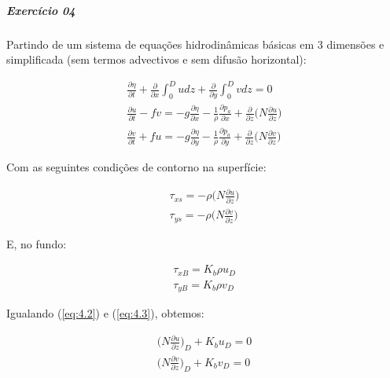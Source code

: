 \documentclass[11pt]{article}
\begin{document}
    \subparagraph{Exercício 04}\label{exercuxedcio-04}

Partindo de um sistema de equações hidrodinâmicas básicas em 3 dimensões
e simplificada (sem termos advectivos e sem difusão horizontal):

\begin{equation}
  \begin{aligned}
  \frac{\partial{\eta}}{\partial{t}} + \frac{\partial}{\partial{x}}\int_{0}^{D}udz + \frac{\partial}{\partial{y}}\int_{0}^{D}vdz = 0
  \\
  \frac{\partial{u}}{\partial{t}} - fv = -g\frac{\partial{\eta}}{\partial{x}} - \frac{1}{\rho}\frac{\partial{p_a}}{\partial{x}} + \frac{\partial}{\partial{z}}\bigg( N\frac{\partial{u}}{\partial{z}} \bigg)
  \\
  \frac{\partial{v}}{\partial{t}} + fu = -g\frac{\partial{\eta}}{\partial{y}} - \frac{1}{\rho}\frac{\partial{p_a}}{\partial{y}} + \frac{\partial}{\partial{z}}\bigg( N\frac{\partial{v}}{\partial{z}} \bigg)
  \label{eq:4.1}
  \end{aligned}
\end{equation}

Com as seguintes condições de contorno na superfície:

\begin{equation}
  \begin{aligned}
  \tau_{xs} = -\rho\bigg( N\frac{\partial{u}}{\partial{z}} \bigg)
  \\
  \tau_{ys} = -\rho\bigg( N\frac{\partial{v}}{\partial{z}} \bigg)
  \label{eq:4.2}
  \end{aligned}
\end{equation}

E, no fundo:

\begin{equation}
  \begin{aligned}
  \tau_{xB} = K_b\rho u_D
  \\
  \tau_{yB} = K_b\rho v_ D
  \label{eq:4.3}
  \end{aligned}
\end{equation}

Igualando (\ref{eq:4.2}) e (\ref{eq:4.3}), obtemos:

\begin{equation}
  \begin{aligned}
  \bigg( N\frac{\partial{u}}{\partial{z}} \bigg)_D + K_b u_D = 0
  \\
  \bigg( N\frac{\partial{v}}{\partial{z}} \bigg)_D + K_b v_ D = 0
  \label{eq:4.4}
  \end{aligned}
\end{equation}
\end{document}
